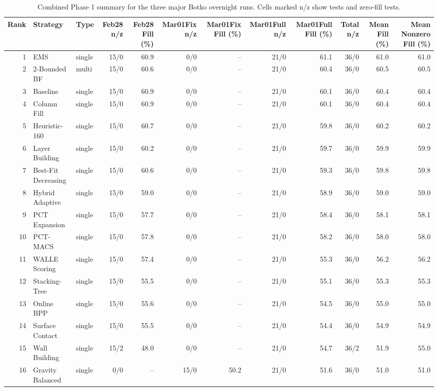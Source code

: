 \documentclass[border=8pt]{standalone}
\begin{document}
\begin{table}[htbp]
\centering
\caption{Combined Phase 1 summary for the three major Botko overnight runs. Cells marked n/z show tests and zero-fill tests.}
\label{tab:botko-last-three-runs}
\small
\setlength{\tabcolsep}{4pt}
\begin{tabular}{rllrrrrrrrrr}
\toprule
Rank & Strategy & Type & Feb28 n/z & Feb28 Fill (\%) & Mar01Fix n/z & Mar01Fix Fill (\%) & Mar01Full n/z & Mar01Full Fill (\%) & Total n/z & Mean Fill (\%) & Mean Nonzero Fill (\%) \\
\midrule
1 & EMS & single & 15/0 & 60.9 & 0/0 & -- & 21/0 & 61.1 & 36/0 & 61.0 & 61.0 \\
2 & 2-Bounded BF & multi & 15/0 & 60.6 & 0/0 & -- & 21/0 & 60.4 & 36/0 & 60.5 & 60.5 \\
3 & Baseline & single & 15/0 & 60.9 & 0/0 & -- & 21/0 & 60.1 & 36/0 & 60.4 & 60.4 \\
4 & Column Fill & single & 15/0 & 60.9 & 0/0 & -- & 21/0 & 60.1 & 36/0 & 60.4 & 60.4 \\
5 & Heuristic-160 & single & 15/0 & 60.7 & 0/0 & -- & 21/0 & 59.8 & 36/0 & 60.2 & 60.2 \\
6 & Layer Building & single & 15/0 & 60.2 & 0/0 & -- & 21/0 & 59.7 & 36/0 & 59.9 & 59.9 \\
7 & Best-Fit Decreasing & single & 15/0 & 60.6 & 0/0 & -- & 21/0 & 59.3 & 36/0 & 59.8 & 59.8 \\
8 & Hybrid Adaptive & single & 15/0 & 59.0 & 0/0 & -- & 21/0 & 58.9 & 36/0 & 59.0 & 59.0 \\
9 & PCT Expansion & single & 15/0 & 57.7 & 0/0 & -- & 21/0 & 58.4 & 36/0 & 58.1 & 58.1 \\
10 & PCT-MACS & single & 15/0 & 57.8 & 0/0 & -- & 21/0 & 58.2 & 36/0 & 58.0 & 58.0 \\
11 & WALLE Scoring & single & 15/0 & 57.4 & 0/0 & -- & 21/0 & 55.3 & 36/0 & 56.2 & 56.2 \\
12 & Stacking-Tree & single & 15/0 & 55.5 & 0/0 & -- & 21/0 & 55.1 & 36/0 & 55.3 & 55.3 \\
13 & Online BPP & single & 15/0 & 55.6 & 0/0 & -- & 21/0 & 54.5 & 36/0 & 55.0 & 55.0 \\
14 & Surface Contact & single & 15/0 & 55.5 & 0/0 & -- & 21/0 & 54.4 & 36/0 & 54.9 & 54.9 \\
15 & Wall Building & single & 15/2 & 48.0 & 0/0 & -- & 21/0 & 54.7 & 36/2 & 51.9 & 55.0 \\
16 & Gravity Balanced & single & 0/0 & -- & 15/0 & 50.2 & 21/0 & 51.6 & 36/0 & 51.0 & 51.0 \\

\end{tabular}
\end{table}
\end{document}
